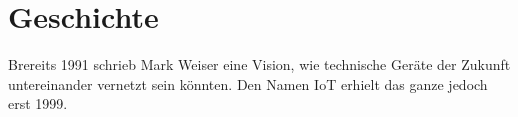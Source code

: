 \section{Geschichte}\label{s:gechichte}

Brereits 1991 schrieb Mark Weiser eine Vision, wie technische Geräte der Zukunft untereinander vernetzt sein könnten\cite{ws:weiser}.
Den Namen \ac{IoT} erhielt das ganze jedoch erst 1999.